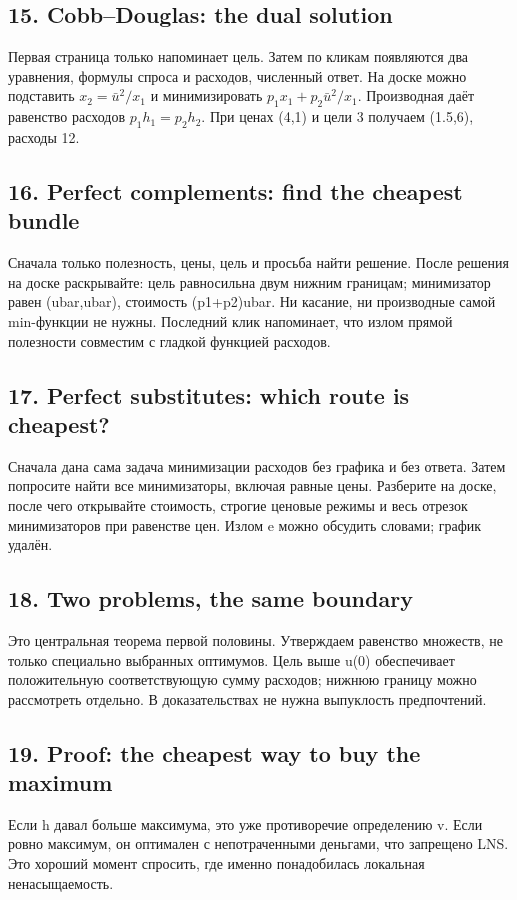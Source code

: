 \documentclass[11pt,a4paper]{article}
\begin{document}
\subsection*{15. Cobb--Douglas: the dual solution}
Первая страница только напоминает цель. Затем по кликам появляются два уравнения, формулы спроса и расходов, численный ответ. На доске можно подставить $x_2=\bar u^2/x_1$ и минимизировать $p_1x_1+p_2\bar u^2/x_1$. Производная даёт равенство расходов $p_1h_1=p_2h_2$. При ценах (4,1) и цели 3 получаем (1.5,6), расходы 12.

\subsection*{16. Perfect complements: find the cheapest bundle}
Сначала только полезность, цены, цель и просьба найти решение. После решения на доске раскрывайте: цель равносильна двум нижним границам; минимизатор равен (ubar,ubar), стоимость (p1+p2)ubar. Ни касание, ни производные самой min-функции не нужны. Последний клик напоминает, что излом прямой полезности совместим с гладкой функцией расходов.

\subsection*{17. Perfect substitutes: which route is cheapest?}
Сначала дана сама задача минимизации расходов без графика и без ответа. Затем попросите найти все минимизаторы, включая равные цены. Разберите на доске, после чего открывайте стоимость, строгие ценовые режимы и весь отрезок минимизаторов при равенстве цен. Излом e можно обсудить словами; график удалён.

\subsection*{18. Two problems, the same boundary}
Это центральная теорема первой половины. Утверждаем равенство множеств, не только специально выбранных оптимумов. Цель выше u(0) обеспечивает положительную соответствующую сумму расходов; нижнюю границу можно рассмотреть отдельно. В доказательствах не нужна выпуклость предпочтений.

\subsection*{19. Proof: the cheapest way to buy the maximum}
Если h давал больше максимума, это уже противоречие определению v. Если ровно максимум, он оптимален с непотраченными деньгами, что запрещено LNS. Это хороший момент спросить, где именно понадобилась локальная ненасыщаемость.
\end{document}
